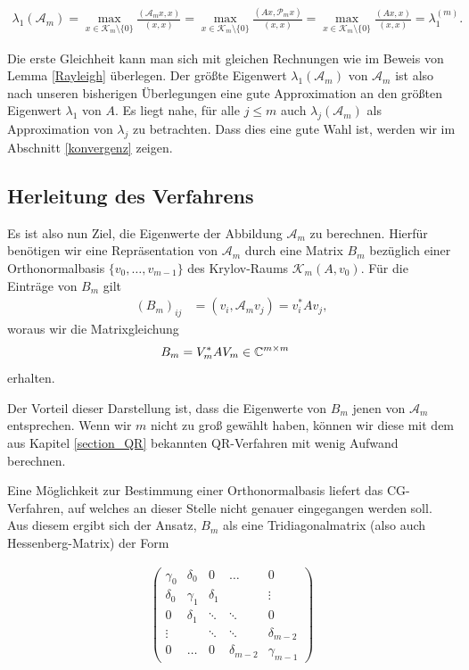 \documentclass{article}
\theoremstyle{plain}
\begin{document}
\begin{align*}
	\lambda_1(\mathcal{A}_m) = \max_{x \in \mathcal{K}_m \setminus \{0\}} \frac{(\mathcal{A}_m x, x)}{(x,x)} = \max_{x \in \mathcal{K}_m \setminus \{0\}} \frac{(Ax, \mathcal{P}_m x)}{(x,x)} = \max_{x \in \mathcal{K}_m \setminus \{0\}} \frac{(A x, x)}{(x,x)} = \lambda_1^{(m)}.
\end{align*}

Die erste Gleichheit kann man sich mit gleichen Rechnungen wie im Beweis von Lemma \ref{Rayleigh} überlegen. Der größte Eigenwert $\lambda_1(\mathcal{A}_m)$ von $\mathcal{A}_m$ ist also nach unseren bisherigen Überlegungen eine gute Approximation an den größten Eigenwert $\lambda_1$ von $A$. Es liegt nahe, für alle $j \leq m$ auch $\lambda_j(\mathcal{A}_m)$ als Approximation von $\lambda_j$ zu betrachten. Dass dies eine gute Wahl ist, werden wir im  Abschnitt \ref{konvergenz} zeigen.

\subsection{Herleitung des Verfahrens}

Es ist also nun Ziel, die Eigenwerte der Abbildung $\mathcal{A}_m$ zu berechnen. Hierfür benötigen wir eine Repräsentation von $\mathcal{A}_m$ durch eine Matrix $B_m$ bezüglich einer Orthonormalbasis $\{v_0, \dots, v_{m-1}\}$ des Krylov-Raums $\mathcal{K}_m(A,v_0)$. Für die Einträge von $B_m$ gilt
\begin{align*}
	(B_m)_{ij} &= (v_i, \mathcal{A}_m v_j) = v_i^*Av_j,
\end{align*}
woraus wir die Matrixgleichung
\begin{align}\label{mateq}
	B_m &= V_m^*AV_m \in \mathbb{C}^{m \times m}
\end{align}
erhalten.

Der Vorteil dieser Darstellung ist, dass die Eigenwerte von $B_m$ jenen von $\mathcal{A}_m$ entsprechen. Wenn wir $m$ nicht zu groß gewählt haben, können wir diese mit dem aus Kapitel \ref{section_QR} bekannten QR-Verfahren mit wenig Aufwand berechnen.

Eine Möglichkeit zur Bestimmung einer Orthonormalbasis liefert das CG-Verfahren, auf welches an dieser Stelle nicht genauer eingegangen werden soll. Aus diesem ergibt sich der Ansatz, $B_m$ als eine Tridiagonalmatrix (also auch Hessenberg-Matrix) der Form

\begin{align}\label{trimatrix}
\begin{pmatrix}
	\gamma_0 & \delta_0 & 0 & \hdots & 0 \\
	\delta_0 & \gamma_1 & \delta_1 &  & \vdots \\
	0 & \delta_1 & \ddots & \ddots & 0 \\
	\vdots &  & \ddots & \ddots & \delta_{m-2} \\
	0 & \hdots & 0 & \delta_{m-2} & \gamma_{m-1}
\end{pmatrix}
\end{align}
\end{document}
